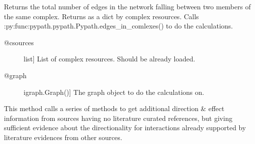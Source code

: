 \documentclass[letterpaper,10pt,english]{sphinxmanual}
\begin{document}
\begin{fulllineitems}
\begin{fulllineitems}
\label{\detokenize{reference:pypath.main.PyPath.sum_in_complex}}
Returns the total number of edges in the network falling
between two members of the same complex.
Returns as a dict by complex resources.
Calls :py:func:pypath.pypath.Pypath.edges\_in\_comlexes()
to do the calculations.
\begin{description}
\item[{@csources}] \leavevmode{[}list{]}
List of complex resources. Should be already loaded.

\item[{@graph}] \leavevmode{[}igraph.Graph(){]}
The graph object to do the calculations on.

\end{description}

\end{fulllineitems}


\begin{fulllineitems}
\label{\detokenize{reference:pypath.main.PyPath.table_latex}}
\end{fulllineitems}


\begin{fulllineitems}
\label{\detokenize{reference:pypath.main.PyPath.third_source_directions}}
This method calls a series of methods to get
additional direction \& effect information
from sources having no literature curated references,
but giving sufficient evidence about the directionality
for interactions already supported by literature
evidences from other sources.


\end{fulllineitems}
\end{fulllineitems}
\end{document}
